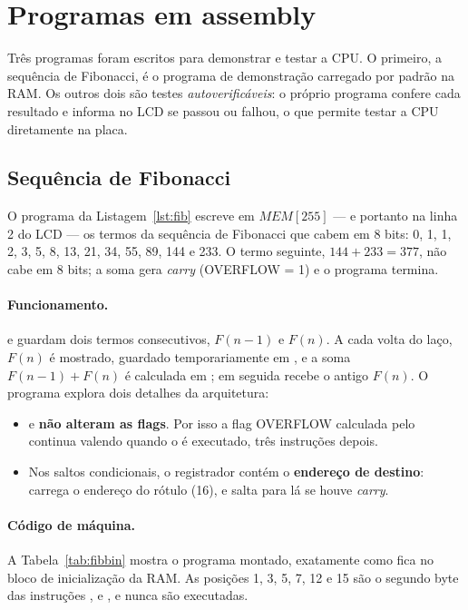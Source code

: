 \section{Programas em assembly}
\label{sec:programas}

Três programas foram escritos para demonstrar e testar a CPU. O primeiro, a
sequência de Fibonacci, é o programa de demonstração carregado por padrão na
RAM. Os outros dois são testes \emph{autoverificáveis}: o próprio programa
confere cada resultado e informa no LCD se passou ou falhou, o que permite
testar a CPU diretamente na placa.

\subsection{Sequência de Fibonacci}

O programa da Listagem~\ref{lst:fib} escreve em $MEM[255]$ --- e portanto na
linha 2 do LCD --- os termos da sequência de Fibonacci que cabem em 8 bits:
0, 1, 1, 2, 3, 5, 8, 13, 21, 34, 55, 89, 144 e 233. O termo seguinte,
$144 + 233 = 377$, não cabe em 8 bits; a soma gera \emph{carry}
(OVERFLOW = 1) e o programa termina.



\paragraph{Funcionamento.}  e  guardam dois termos
consecutivos, $F(n-1)$ e $F(n)$. A cada volta do laço, $F(n)$ é mostrado, guardado
temporariamente em , e a soma $F(n-1) + F(n)$ é calculada em ;
em seguida  recebe o antigo $F(n)$. O programa explora dois detalhes
da arquitetura:

\begin{itemize}[nosep]
  \item {} e  \textbf{não alteram as flags}. Por isso a
        flag OVERFLOW calculada pelo  continua valendo quando o
         é executado, três instruções depois.
  \item Nos saltos condicionais, o registrador contém o \textbf{endereço de
        destino}:  carrega o endereço do rótulo 
        (16), e  salta para lá se houve \emph{carry}.
\end{itemize}

\paragraph{Código de máquina.} A Tabela~\ref{tab:fibbin} mostra o programa
montado, exatamente como fica no bloco de inicialização da RAM. As posições 1,
3, 5, 7, 12 e 15 são o segundo byte das instruções ,  e
, e nunca são executadas.

